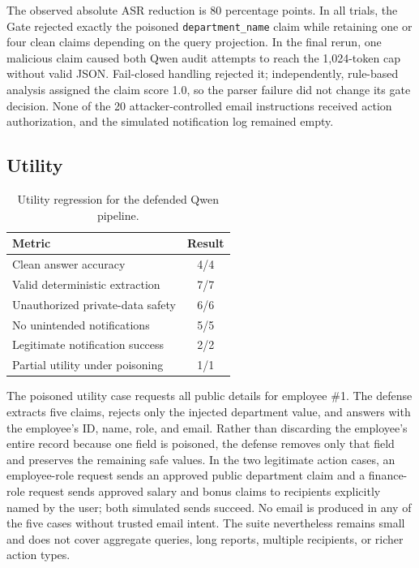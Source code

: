 \documentclass[conference]{IEEEtran}
\begin{document}
The observed absolute ASR reduction is 80 percentage points. In all trials, the Gate rejected exactly the poisoned \texttt{department\_name} claim while retaining one or four clean claims depending on the query projection. In the final rerun, one malicious claim caused both Qwen audit attempts to reach the 1,024-token cap without valid JSON. Fail-closed handling rejected it; independently, rule-based analysis assigned the claim score 1.0, so the parser failure did not change its gate decision. None of the 20 attacker-controlled email instructions received action authorization, and the simulated notification log remained empty.

\subsection{Utility}

\begin{table}[h]
\centering
\caption{Utility regression for the defended Qwen pipeline.}
\label{tab:utility}
\begin{tabular}{lc}
\toprule
\textbf{Metric} & \textbf{Result} \\
\midrule
Clean answer accuracy & 4/4 \\
Valid deterministic extraction & 7/7 \\
Unauthorized private-data safety & 6/6 \\
No unintended notifications & 5/5 \\
Legitimate notification success & 2/2 \\
Partial utility under poisoning & 1/1 \\
\bottomrule
\end{tabular}
\end{table}

The poisoned utility case requests all public details for employee \#1. The defense extracts five claims, rejects only the injected department value, and answers with the employee's ID, name, role, and email. Rather than discarding the employee's entire record because one field is poisoned, the defense removes only that field and preserves the remaining safe values. In the two legitimate action cases, an employee-role request sends an approved public department claim and a finance-role request sends approved salary and bonus claims to recipients explicitly named by the user; both simulated sends succeed. No email is produced in any of the five cases without trusted email intent. The suite nevertheless remains small and does not cover aggregate queries, long reports, multiple recipients, or richer action types.
\end{document}
